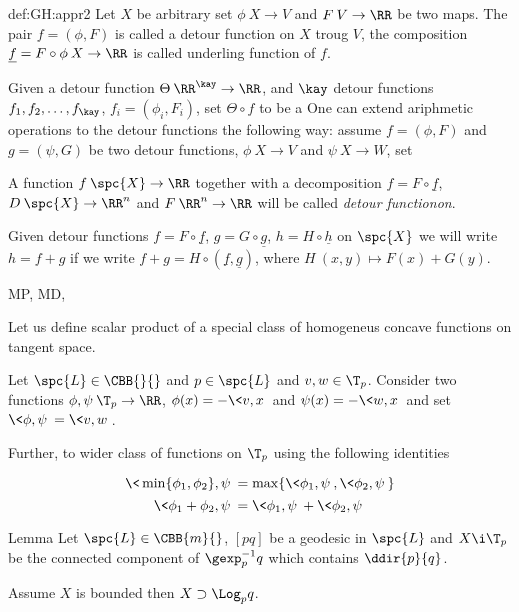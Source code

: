 {\begin{subthm}{def:GH:appr2}
Let $X$ be arbitrary set
$\phi\:X\to V$ and $F\:V\to\RR$ be two maps.
The pair $f=(\phi,F)$ is called a detour function on $X$ troug $V$,
the composition $\underline f=F\circ\phi\:X\to\RR$ is called underling function of $f$.

Given a detour function $\Theta\:\RR^\kay\to\RR$, 
and $\kay$ detour functions $f_1,f_2,\dots, f_\kay$, $f_i=(\phi_i,F_i)$,
set $\Theta\circ f$ to be a 
One can extend ariphmetic operations to the detour functions the following way:
assume $f=(\phi,F)$ and $g=(\psi,G)$ be two detour functions, $\phi\:X\to V$ and $\psi\:X\to W$,
set 

A function $f\:\spc{X}\to\RR$ together with a decomposition $f=F\circ \underline f$, $D\:\spc{X}\to\RR^n$ and $F\:\RR^n\to\RR$  will be called \emph{detour functionon}.

Given detour functions $f=F\circ \underline f$, $g=G\circ \underline g$, $h=H\circ \underline h$ on $\spc{X}$ we will write $h=f+g$ if
we write 
$f+g=H\circ(\underline f,\underline g)$, where $H\:(x,y)\mapsto F(x)+G(y)$.


MP,
MD,

Let us define scalar product of a special class of homogeneus concave functions on tangent space.

Let $\spc{L}\in\CBB{}{}$ and $p\in \spc{L}$ and $v,w\in\T_p$.
Consider two functions $\phi,\psi\:\T_p\to\RR$,
$\phi(x)=-\<v,x\>$ and $\psi(x)=-\<w,x\>$ and set
$\<\phi,\psi\>=\<v,w\>$.

Further, to wider class of functions on $\T_p$ using the following identities

$$\<\min\{\phi_1,\phi_2\},\psi\>=\max\{\<\phi_1,\psi\>,\<\phi_2,\psi\>\}$$
$$\<\phi_1+\phi_2,\psi\>=\<\phi_1,\psi\>+\<\phi_2,\psi\>$$










\begin{thm}{Lemma}
Let $\spc{L}\in\CBB{m}{}$, 
$[pq]$ be a geodesic in $\spc{L}$
and $X\i \T_p$ be the connected component of $\gexp_p^{-1}q$ which contains $\ddir{p}{q}$.

Assume $X$ is bounded then $X\supset \Log_pq$.
\end{thm}


\end{subthm}}
